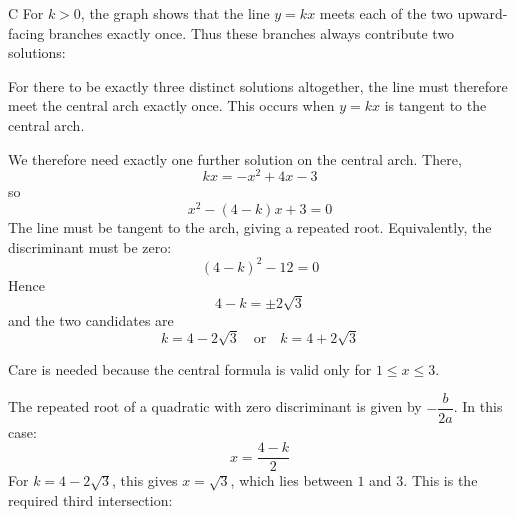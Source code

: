 \documentclass[11pt,a4paper]{article}
\begin{document}
\begin{enumerate}[label=\textbf{\arabic*.},leftmargin=*,itemsep=0pt,start=19]
\begin{djsSolution}{C}
For \(k>0\), the graph shows that the line \(y=kx\) meets each of the two upward-facing branches exactly once. Thus these branches always contribute two solutions:

\begin{djsSolutionFigure}
\end{djsSolutionFigure}

For there to be exactly three distinct solutions altogether, the line must therefore meet the central arch exactly once. This occurs when \(y=kx\) is tangent to the central arch.

We therefore need exactly one further solution on the central arch. There,
\[
kx=-x^2+4x-3
\]
so
\[
x^2-(4-k)x+3=0
\]
The line must be tangent to the arch, giving a repeated root. Equivalently, the discriminant must be zero:
\[
(4-k)^2-12=0
\]
Hence
\[
4-k=\pm2\sqrt3
\]
and the two candidates are
\[
k=4-2\sqrt3\quad\text{or}\quad k=4+2\sqrt3
\]

Care is needed because the central formula is valid only for $1\leq x\leq3$. 

The repeated root of a quadratic with zero discriminant is given by $-\dfrac{b}{2a}$. In this case:
\[
x=\frac{4-k}{2}
\]
For $k=4-2\sqrt3$, this gives $x=\sqrt3$, which lies between $1$ and $3$. This is the required third intersection:

\begin{djsSolutionFigure}
\end{djsSolutionFigure}
\end{djsSolution}
\end{enumerate}
\end{document}
